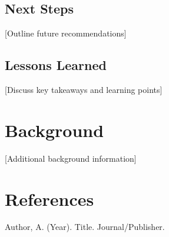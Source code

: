 \documentclass[12pt,a4paper]{article}
\begin{document}
\subsection{Next Steps}
[Outline future recommendations]

\subsection{Lessons Learned}
[Discuss key takeaways and learning points]

\begin{appendices}
\section{Background}
[Additional background information]

\section{References}
\begin{thebibliography}{9}
     Author, A. (Year). Title. Journal/Publisher.
\end{thebibliography}
\end{appendices}
\end{document}
